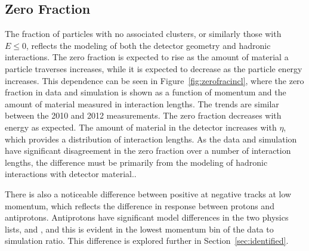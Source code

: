 \subsection{Zero Fraction}
\label{sec:zero_fraction}

The fraction of particles with no associated clusters, or similarly those with $E \leq 0$, reflects the modeling of both the detector geometry and hadronic interactions.
The zero fraction is expected to rise as the amount of material a particle traverses increases, while it is expected to decrease as the particle energy increases.
This dependence can be seen in Figure~\ref{fig:zerofracincl}, where the zero fraction in data and simulation is shown as a function of momentum and the amount of material measured in interaction lengths.
The trends are similar between the 2010 and 2012 measurements.
The zero fraction decreases with energy as expected.
The amount of material in the detector increases with $\eta$, which provides a distribution of interaction lengths.
As the data and simulation have significant disagreement in the zero fraction over a number of interaction lengths, the difference must be primarily from the modeling of hadronic interactions with detector material..

There is also a noticeable difference between positive at negative tracks at low momentum, which reflects the difference in response between protons and antiprotons.
Antiprotons have significant model differences in the two physics lists, \QGSP and \FTFP, and this is evident in the lowest momentum bin of the data to simulation ratio.
This difference is explored further in Section~\ref{sec:identified}.


